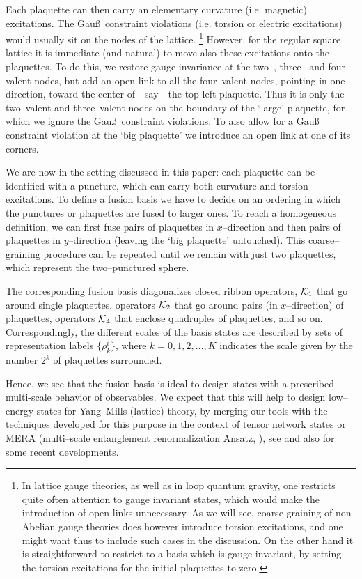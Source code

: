 \documentclass[nofootinbib,superscriptaddress,eqsecnum,tightenlines,11pt]{revtex4-1}
\begin{document}
Each plaquette can then carry an elementary curvature (i.e. magnetic) excitations. 
The Gau\ss~constraint violations (i.e. torsion or electric excitations) would usually sit on the nodes of the lattice.%
\footnote{In lattice gauge theories, as well as in loop quantum gravity, one restricts quite often  attention to gauge invariant states, which would make the introduction of open links unnecessary. As we will see, coarse graining of non--Abelian gauge theories does however introduce torsion excitations, and one might want thus to include such cases in the discussion. On the other hand it is straightforward to restrict to a basis which is gauge invariant, by setting the torsion excitations for the initial plaquettes  to zero.}
However, for the regular square lattice it is immediate (and natural) to move also these excitations onto the plaquettes.
To do this, we restore gauge invariance at the two--,  three-- and four--valent nodes, but add an open link  to all the four--valent nodes, pointing in one direction, toward the center of---say---the top-left plaquette. 
   Thus it is only the two--valent and  three--valent nodes on the boundary of the `large' plaquette, for which we ignore the Gau\ss~constraint violations. 
To also allow for a Gau\ss~ constraint violation at the `big  plaquette' we introduce an open link at one of its corners. 


We are now in the setting discussed in this paper: each plaquette can be identified with a puncture, which can carry both curvature and torsion excitations. 
To define a fusion basis we have to decide on an ordering in which the punctures or plaquettes are fused to larger ones.  
To reach a homogeneous definition, we can  first fuse pairs of plaquettes in $x$--direction and then pairs of plaquettes in $y$--direction (leaving the `big plaquette' untouched). 
This coarse--graining procedure can be repeated until we remain with just two plaquettes, which represent the two--punctured sphere. 


The corresponding fusion basis diagonalizes closed ribbon operators, ${\cal K}_1$ that go around single plaquettes, operators ${\cal K}_2$ that go around pairs (in $x$--direction) of plaquettes, operators ${\cal K}_4$ that enclose quadruples of plaquettes, and so on. 
Correspondingly, the different scales of the basis states are described by sets of representation labels $\{\rho^i_k\}$, where $k=0,1,2, \dots, K$ indicates the scale given by the number $2^k$ of plaquettes surrounded. 

Hence, we see that the fusion basis is ideal to design states with a prescribed multi-scale behavior of observables. %
We expect that this will help to design low--energy states for Yang--Mills (lattice) theory, by merging our tools with the techniques developed for this purpose in the context of tensor network states or MERA (multi--scale entanglement renormalization Ansatz, \cite{VidalM}), see \cite{Ashley} and also \cite{Luca} for some recent developments.
\end{document}
